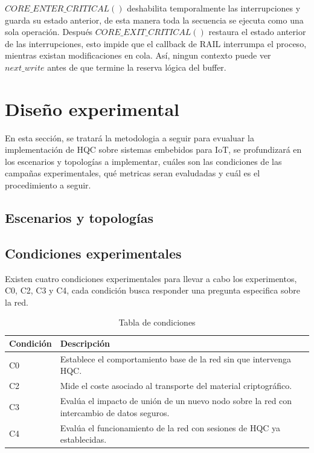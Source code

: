   $CORE\_ENTER\_CRITICAL()$ deshabilita temporalmente las interrupciones y guarda su estado anterior, de esta manera toda la secuencia
  se ejecuta como una sola operación. Después $CORE\_EXIT\_CRITICAL()$ restaura el estado anterior de las interrupciones, esto impide
  que el callback de RAIL interrumpa el proceso, mientras existan modificaciones en cola. Así, ningun contexto puede ver $next\_write$
  antes de que termine la reserva lógica del buffer. 

\section{Diseño experimental}
  En esta sección, se tratará la metodologia a seguir para evualuar la implementación de HQC sobre sistemas embebidos para IoT, 
  se profundizará en los escenarios y topologías a implementar, cuáles son las condiciones de las campañas experimentales, qué 
  metricas seran evaludadas y cuál es el procedimiento a seguir. 

  \subsection{Escenarios y topologías}

  

  \subsection{Condiciones experimentales}

  Existen cuatro condiciones experimentales para llevar a cabo los experimentos, C0, C2, C3 y C4, cada condición busca
  responder una pregunta especifica sobre la red. 

\begin{table}[!htbp]
    \centering
    \caption{Tabla de condiciones}
    \label{tab:cond}
    \begin{tabular}{l p{10cm}}
        \hline
        \textbf{Condición} & \textbf{Descripción} \\
        \hline
        C0 & Establece el comportamiento base de la red sin que intervenga HQC. \\
        C2 & Mide el coste asociado al transporte del material criptográfico. \\
        C3 & Evalúa el impacto de unión de un nuevo nodo sobre la red con intercambio de datos seguros. \\
        C4 & Evalúa el funcionamiento de la red con sesiones de HQC ya establecidas. \\
        \hline
    \end{tabular}
\end{table}

